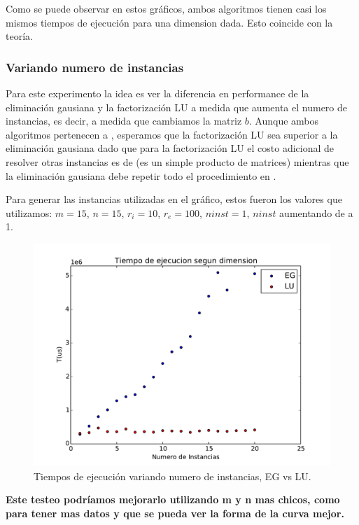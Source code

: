 Como se puede observar en estos gráficos, ambos algoritmos tienen casi los mismos tiempos de ejecución para una dimension dada. Esto coincide con la teoría.

\pagebreak

\subsubsection{Variando numero de instancias}

Para este experimento la idea es ver la diferencia en performance de la eliminación gausiana y la factorización LU a medida que aumenta el numero de instancias, es decir, a medida que cambiamos la matriz $b$. Aunque ambos algoritmos pertenecen a , esperamos que la factorización LU sea superior a la eliminación gausiana dado que para la factorización LU el costo adicional de resolver otras instancias es de  (es un simple producto de matrices) mientras que la eliminación gausiana debe repetir todo el procedimiento en .

Para generar las instancias utilizadas en el gráfico, estos fueron los valores que utilizamos: $m = 15$, $n = 15$, $r_i = 10$, $r_e = 100$, $ninst = 1$, $ninst$ aumentando de a 1.

\begin{figure}[h]
\centering
\includegraphics[scale=0.7]{graficos/ninstVariable.pdf}
\caption{Tiempos de ejecución variando numero de instancias, EG vs LU.}
\end{figure}

\textbf{Este testeo podríamos mejorarlo utilizando m y n mas chicos, como para tener mas datos y que se pueda ver la forma de la curva mejor.}

